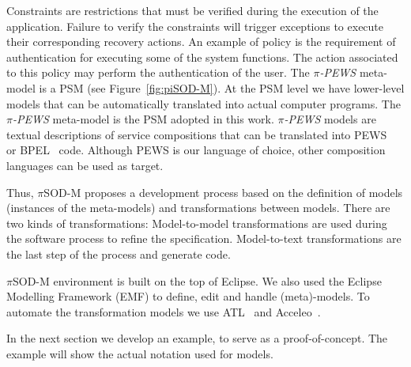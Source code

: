 Constraints are restrictions that must be verified during the execution of the application. 
Failure to verify the constraints will trigger exceptions to execute their corresponding recovery actions.
An example of policy is the requirement of authentication for executing some of the system functions. 
The action associated to this policy may perform the authentication of the user.
%
The \textit{$\pi$-PEWS} meta-model is a PSM (see Figure~\ref{fig:piSOD-M}).
At the PSM level we have lower-level models that can be automatically translated into actual computer programs.
The \textit{$\pi$-PEWS} meta-model is the PSM adopted in this work.
\textit{$\pi$-PEWS} models are textual descriptions of service compositions that can be translated into PEWS~\cite{BHM06} %
or BPEL~\cite{bpel03} code.
Although PEWS is our language of choice, other composition languages can be used as target.





%
Thus, $\pi$SOD-M proposes a development process based on the definition of models
(instances of the meta-models) and transformations between models.
There are two kinds of transformations:
Model-to-model transformations are used during the software process to refine the specification.
Model-to-text transformations are the last step of the process and generate code.

$\pi$SOD-M environment is built on the top of Eclipse. 
We also used the Eclipse Modelling Framework (EMF) to define, edit and handle
(meta)-models. 
To automate the transformation models we use ATL~\cite{atl_manual} and Acceleo~\cite{acceleo}.

In the next section we develop an example, to serve as a proof-of-concept.
The example will show the actual notation used for models. 





